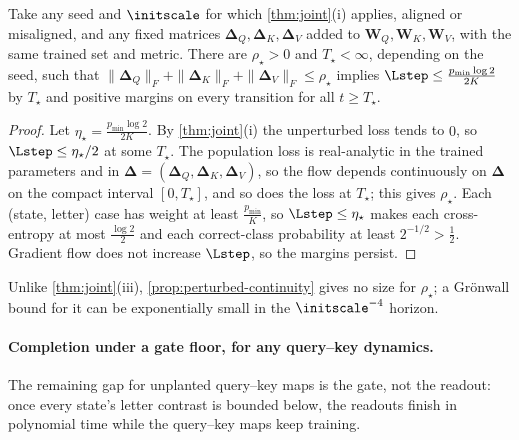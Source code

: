 \begin{proposition}
\label{prop:perturbed-continuity}
Take any seed and $\initscale$ for which \cref{thm:joint}(i) applies, aligned or misaligned, and any fixed matrices $\bm\Delta_Q,\bm\Delta_K,\bm\Delta_V$ added to
$\mathbf W_Q,\mathbf W_K,\mathbf W_V$, with the same trained set and metric. There are $\rho_\star>0$ and $T_\star<\infty$, depending on the seed, such that
$\|\bm\Delta_Q\|_F+\|\bm\Delta_K\|_F+\|\bm\Delta_V\|_F\le\rho_\star$ implies $\Lstep\le\frac{p_{\min}\log2}{2K}$ by $T_\star$ and positive margins on every
transition for all $t\ge T_\star$.
\end{proposition}

\begin{proof}
Let $\eta_\star=\frac{p_{\min}\log2}{2K}$. By \cref{thm:joint}(i) the unperturbed loss tends to $0$, so $\Lstep\le\eta_\star/2$ at some $T_\star$. The
population loss is real-analytic in the trained parameters and in $\bm\Delta=(\bm\Delta_Q,\bm\Delta_K,\bm\Delta_V)$, so the flow depends continuously on
$\bm\Delta$ on the compact interval $[0,T_\star]$, and so does the loss at $T_\star$; this gives $\rho_\star$. Each (state, letter) case has weight at
least $\frac{p_{\min}}K$, so $\Lstep\le\eta_\star$ makes each cross-entropy at most $\frac{\log2}2$ and each correct-class probability at least
$2^{-1/2}>\frac12$. Gradient flow does not increase $\Lstep$, so the margins persist.
\end{proof}

Unlike \cref{thm:joint}(iii), \cref{prop:perturbed-continuity} gives no size for $\rho_\star$; a Gr\"onwall bound for it can be exponentially small
in the $\initscale^{-4}$ horizon.

\paragraph{Completion under a gate floor, for any query--key dynamics.} The remaining gap for unplanted query--key maps is the gate, not
the readout: once every state's letter contrast is bounded below, the readouts finish in polynomial time while the query--key maps keep training.

